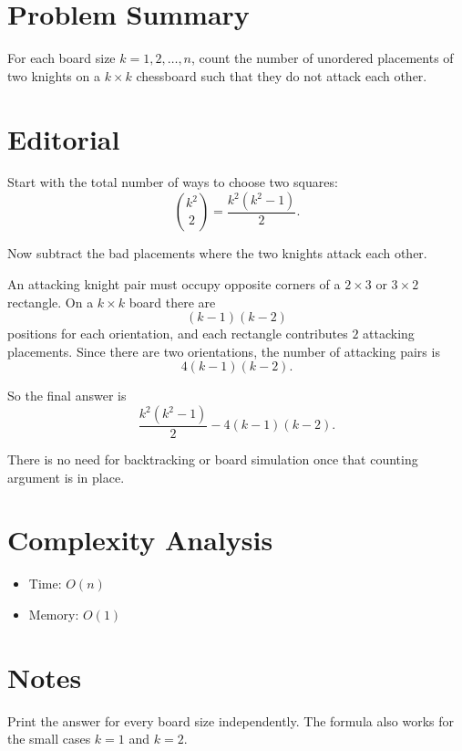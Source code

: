 \section{Problem Summary}
For each board size \(k = 1, 2, \ldots, n\), count the number of unordered placements of two knights on a \(k \times k\) chessboard such that they do not attack each other.

\section{Editorial}
Start with the total number of ways to choose two squares:
\[
\binom{k^2}{2} = \frac{k^2(k^2 - 1)}{2}.
\]

Now subtract the bad placements where the two knights attack each other.

An attacking knight pair must occupy opposite corners of a \(2 \times 3\) or \(3 \times 2\) rectangle. On a \(k \times k\) board there are
\[
(k - 1)(k - 2)
\]
positions for each orientation, and each rectangle contributes \(2\) attacking placements. Since there are two orientations, the number of attacking pairs is
\[
4(k - 1)(k - 2).
\]

So the final answer is
\[
\frac{k^2(k^2 - 1)}{2} - 4(k - 1)(k - 2).
\]

There is no need for backtracking or board simulation once that counting argument is in place.

\section{Complexity Analysis}
\begin{itemize}
\item Time: \(O(n)\)
\item Memory: \(O(1)\)
\end{itemize}

\section{Notes}
Print the answer for every board size independently. The formula also works for the small cases \(k = 1\) and \(k = 2\).
